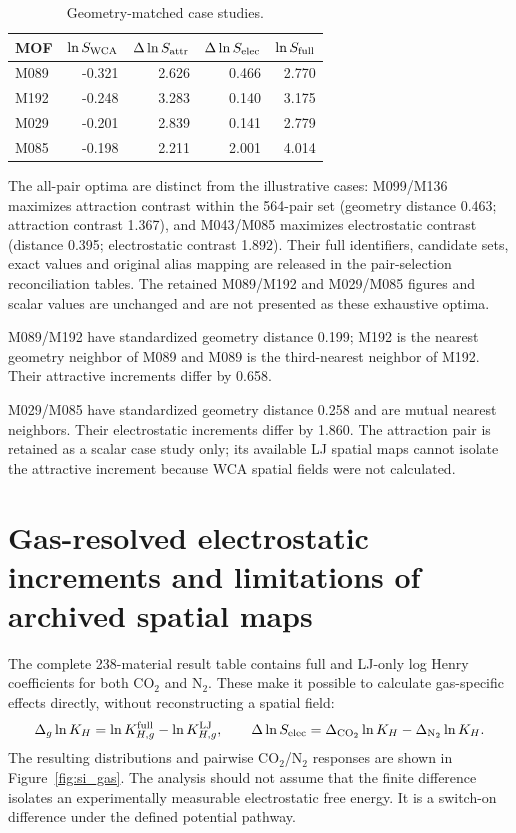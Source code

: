 \documentclass[11pt,a4paper]{article}
\begin{document}
\begin{table}[H]
\centering
\caption{Geometry-matched case studies.}
\begin{tabular}{lrrrr}
\toprule
MOF & $\ln S_{\rm WCA}$ & $\Delta\ln S_{\rm attr}$ & $\Delta\ln S_{\rm elec}$ & $\ln S_{\rm full}$\\
\midrule
M089 & -0.321 & 2.626 & 0.466 & 2.770\\
M192 & -0.248 & 3.283 & 0.140 & 3.175\\
M029 & -0.201 & 2.839 & 0.141 & 2.779\\
M085 & -0.198 & 2.211 & 2.001 & 4.014\\
\bottomrule
\end{tabular}
\end{table}

The all-pair optima are distinct from the illustrative cases: M099/M136 maximizes attraction contrast within the 564-pair set (geometry distance 0.463; attraction contrast 1.367), and M043/M085 maximizes electrostatic contrast (distance 0.395; electrostatic contrast 1.892). Their full identifiers, candidate sets, exact values and original alias mapping are released in the pair-selection reconciliation tables. The retained M089/M192 and M029/M085 figures and scalar values are unchanged and are not presented as these exhaustive optima.

M089/M192 have standardized geometry distance 0.199; M192 is the nearest geometry neighbor of M089 and M089 is the third-nearest neighbor of M192. Their attractive increments differ by 0.658.

M029/M085 have standardized geometry distance 0.258 and are mutual nearest neighbors. Their electrostatic increments differ by 1.860. The attraction pair is retained as a scalar case study only; its available LJ spatial maps cannot isolate the attractive increment because WCA spatial fields were not calculated.

\section{Gas-resolved electrostatic increments and limitations of archived spatial maps}

The complete 238-material result table contains full and LJ-only log Henry coefficients for both CO$_2$ and N$_2$. These make it possible to calculate gas-specific effects directly, without reconstructing a spatial field:
\begin{align}
\Delta_g\ln K_H =\ln K^{\rm full}_{H,g}-\ln K^{\rm LJ}_{H,g},\qquad
\Delta\ln S_{\rm elec}=\Delta_{\mathrm{CO_2}}\ln K_H-\Delta_{\mathrm{N_2}}\ln K_H.
\end{align}
The resulting distributions and pairwise CO$_2$/N$_2$ responses are shown in Figure~\ref{fig:si_gas}. The analysis should not assume that the finite difference isolates an experimentally measurable electrostatic free energy. It is a switch-on difference under the defined potential pathway.
\end{document}

